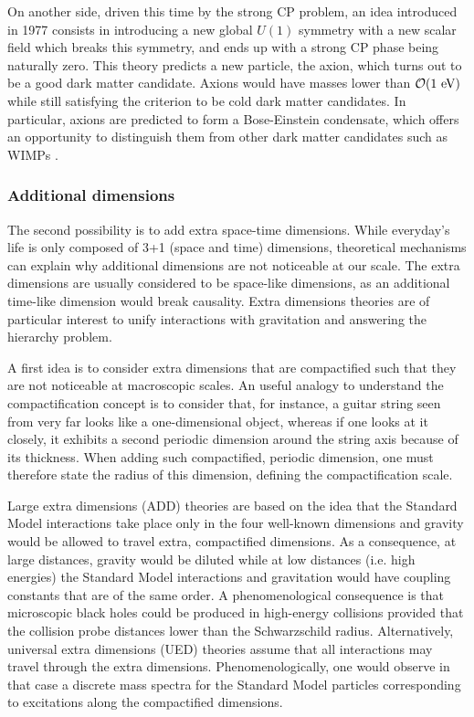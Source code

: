     On another side, driven this time by the strong CP problem,
    an idea introduced in 1977 \cite{PecceiQuinnAxion} consists in introducing a new
    global $U(1)$ symmetry with a new scalar field which breaks this symmetry, and
    ends up with a strong CP phase being naturally zero. This theory predicts a new
    particle, the axion, which turns out to be a good dark matter candidate.
    Axions would have masses lower than $\mathcal{O}(1~\text{eV})$ while still satisfying
    the criterion to be cold dark matter candidates. In particular, axions are predicted to
    form a Bose-Einstein condensate, which offers an opportunity to distinguish them
    from other dark matter candidates such as WIMPs \cite{AxionBoseEinstein}.

    \subsubsection{Additional dimensions}

    The second possibility is to add extra space-time dimensions. While
    everyday's life is only composed of 3+1 (space and time) dimensions,
    theoretical mechanisms can explain why additional dimensions are not
    noticeable at our scale.  The extra dimensions are usually considered to be
    space-like dimensions, as an additional time-like dimension would break
    causality. Extra dimensions theories are of particular interest to unify
    interactions with gravitation and answering the hierarchy problem.

    A first idea is to consider extra dimensions that are compactified such that
    they are not noticeable at macroscopic scales. An useful analogy to
    understand the compactification concept is to consider that, for instance, a
    guitar string seen from very far looks like a one-dimensional object,
    whereas if one looks at it closely, it exhibits a second periodic dimension
    around the string axis because of its thickness. When adding such
    compactified, periodic dimension, one must therefore state the radius of
    this dimension, defining the compactification scale.

    Large extra dimensions (ADD) \cite{ADD} theories are based on the idea that
    the Standard Model interactions take place only in the four well-known
    dimensions and gravity would be allowed to travel extra, compactified
    dimensions. As a consequence, at large distances, gravity would be diluted
    while at low distances (i.e. high energies) the Standard Model interactions
    and gravitation would have coupling constants that are of the same order. A
    phenomenological consequence is that microscopic black holes could be
    produced in high-energy collisions provided that the collision probe
    distances lower than the Schwarzschild radius. Alternatively, universal
    extra dimensions (UED) \cite{UED} theories assume that all interactions may
    travel through the extra dimensions. Phenomenologically, one would observe
    in that case a discrete mass spectra for the Standard Model particles
    corresponding to excitations along the compactified dimensions.

